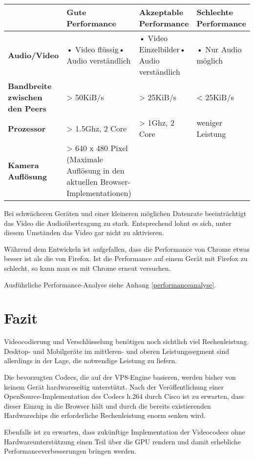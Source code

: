 		\noindent
		\begin{tabularx}{\linewidth}{|X|X|X|X|}
			\hline
			& \textbf{Gute Performance} & \textbf{Akzeptable Performance} & \textbf{Schlechte Performance} \\
			\hline
			\textbf{Audio/Video} & • Video flüssig\newline• Audio verständlich & • Video Einzelbilder\newline• Audio verständlich & • Nur Audio möglich\\
			\hline
			\textbf{Bandbreite zwischen den Peers} &> 50KiB/s &> 25KiB/s &< 25KiB/s \\
			\hline
			\textbf{Prozessor} &> 1.5Ghz, 2 Core &> 1Ghz, 2 Core &weniger Leistung \\
			\hline
			\textbf{Kamera Auflösung} &> 640 x 480 Pixel (Maximale Auflösung in den
			aktuellen Browser-Implementationen) & & \\
			\hline
		\end{tabularx}
		
		\vspace{0.5cm}
		Bei schwächeren Geräten und einer kleineren möglichen Datenrate beeinträchtigt das Video die Audioübertragung zu stark. Entsprechend lohnt es sich, unter diesem Umständen das Video gar nicht zu aktivieren.
		
		Während dem Entwickeln ist aufgefallen, dass die Performance von Chrome etwas
		besser ist als die von Firefox. Ist die Performance auf einem Gerät mit Firefox zu schlecht, so kann man es mit Chrome erneut versuchen.
			
		Ausführliche Performance-Analyse siehe Anhang \ref{performanceanalyse}.
	
	
	\section{Fazit}
		Videocodierung und Verschlüsselung benötigen noch sichtlich viel Rechenleistung. Desktop- und Mobilgeräte im mittleren- und oberen Leistungssegment sind allerdings in der Lage, die notwendige Leistung zu liefern.
		
		Die bevorzugten Codecs, die auf der VP8-Engine basieren, werden bisher von
		keinem Gerät hardwareseitig unterstützt. Nach der Veröffentlichung einer OpenSource-Implementation des Codecs h.264 durch Cisco ist zu erwarten, dass dieser Einzug in die Browser hält und durch die bereits existierenden Hardwarechips die erforderliche Rechenleistung enorm senken wird.
			
		Ebenfalls ist zu erwarten, dass zukünftige Implementation der Videocodecs ohne
		Hardwareunterstützung einen Teil über die GPU rendern und damit erhebliche Performanceverbesserungen bringen werden.
			
